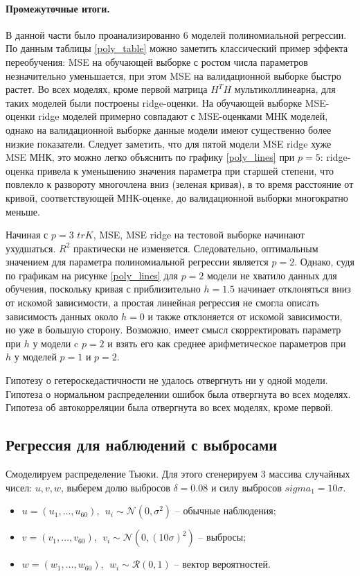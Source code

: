 \documentclass[a4paper,12pt]{article}
\begin{document}
\paragraph{Промежуточные итоги.\\}
В данной части было проанализированно 6 моделей полиномиальной регрессии. По данным таблицы \ref{poly_table} можно заметить классический пример эффекта переобучения: MSE на обучающей выборке с ростом числа параметров незначительно уменьшается, при этом MSE на валидационной выборке быстро растет. Во всех моделях, кроме первой матрица $H^T H$ мультиколлинеарна, для таких моделей были построены ridge-оценки. На обучающей выборке MSE-оценки ridge моделей примерно совпадают с MSE-оценками МНК моделей, однако на валидационной выборке данные модели имеют существенно более низкие показатели. Следует заметить, что для пятой модели MSE ridge хуже MSE МНК, это можно легко объяснить по графику \ref{poly_lines} при $p=5$: ridge-оценка привела к уменьшению значения параметра при старшей степени, что повлекло к развороту многочлена вниз (зеленая кривая), в то время расстояние от кривой, соответствующей МНК-оценке, до валидационной выборки многократно меньше.

Начиная с $p=3$ $tr K$, MSE, MSE ridge на тестовой выборке начинают ухудшаться. $R^2$ практически не изменяется. Следовательно, оптимальным значением для параметра полиномиальной регрессии является $p=2$. Однако, судя по графикам на рисунке \ref{poly_lines} для $p=2$ модели не хватило данных для обучения, поскольку кривая с приблизительно $h=1.5$ начинает отклоняться вниз от искомой зависимости, а простая линейная регрессия не смогла описать зависимость данных около $h=0$ и также отклоняется от искомой зависимости, но уже в большую сторону. Возможно, имеет смысл скорректировать параметр при $h$ у модели c $p=2$ и взять его как среднее арифметическое параметров при $h$ у моделей $p=1$ и $p=2$.

Гипотезу о гетероскедастичности не удалось отвергнуть ни у одной модели. Гипотеза о нормальном распределении ошибок была отвергнута во всех моделях. Гипотеза об автокорреляции была отвергнута во всех моделях, кроме первой.
\newpage


\subsection{Регрессия для наблюдений с выбросами}

Смоделируем распределение Тьюки. Для этого сгенерируем 3 массива случайных чисел: $u, v, w$, выберем долю выбросов $\delta=0.08$ и силу выбросов $sigma_1 = 10\sigma$.
\begin{itemize}
    \item $u=(u_1,\ldots,u_{60}),~~u_i \sim \mathcal{N}(0,\sigma^2)$ -- обычные наблюдения;
    \item $v=(v_1,\ldots,v_{60}),~~v_i \sim \mathcal{N}(0,(10\sigma)^2)$ -- выбросы;
    \item $w=(w_1,\ldots,w_{60}),~~w_i \sim \mathcal{R}(0,1)$ -- вектор вероятностей.
\end{itemize}
\end{document}
